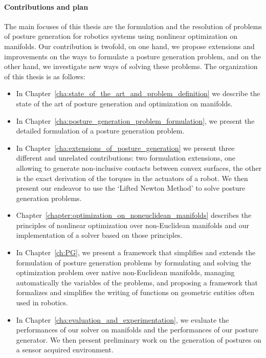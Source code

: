
\paragraph{Contributions and plan}
The main focuses of this thesis are the formulation and the resolution of problems of posture generation for robotics systems using nonlinear optimization on manifolds.
Our contribution is twofold, on one hand, we propose extensions and improvements on the ways to formulate a posture generation problem, and on the other hand, we investigate new ways of solving these problems.
The organization of this thesis is as follows:
\begin{itemize}
  \item In Chapter~\ref{cha:state_of_the_art_and_problem_definition} we describe the state of the art of posture generation and optimization on manifolds.
  \item In Chapter~\ref{cha:posture_generation_problem_formulation}, we present the detailed formulation of a posture generation problem.
  \item In Chapter~\ref{cha:extensions_of_posture_generation} we present three different and unrelated contributions: two formulation extensions, one allowing to generate non-inclusive contacts between convex surfaces, the other is the exact derivation of the torques in the actuators of a robot.
  We then present our endeavor to use the `Lifted Newton Method' to solve posture generation problems.
  \item Chapter~\ref{chapter:optimization_on_noneuclidean_manifolds} describes the principles of nonlinear optimization over non-Euclidean manifolds and our implementation of a solver based on those principles.
  \item In Chapter~\ref{ch:PG}, we present a framework that simplifies and extends the formulation of posture generation problems by formulating and solving the optimization problem over native non-Euclidean manifolds, managing automatically the variables of the problems, and proposing a framework that formalizes and simplifies the writing of functions on geometric entities often used in robotics.
  \item In Chapter~\ref{cha:evaluation_and_experimentation}, we evaluate the performances of our solver on manifolds and the performances of our posture generator. We then present preliminary work on the generation of postures on a sensor acquired environment.
\end{itemize}


